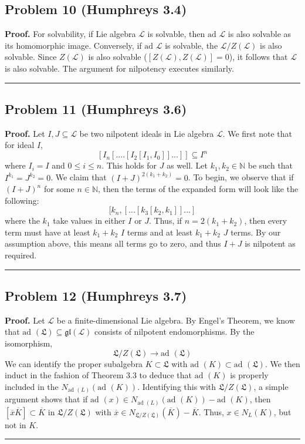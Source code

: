 \documentclass[12pt]{article}%
\newenvironment{proof}[1][Proof]{\textbf{#1.} }{\ \rule{0.5em}{0.5em}}
\begin{document}
  \subsection*{Problem 10 (Humphreys 3.4)}
    \begin{proof}
      For solvability, if Lie algebra $\mathcal{L}$ is solvable, then $\text{ad } \mathcal{L}$ is also solvable as its homomorphic image. Conversely, if  $\text{ad } \mathcal{L}$ is solvable, the $\mathcal{L}/Z(\mathcal{L})$ is also solvable. Since  $Z(\mathcal{L})$ is also solvable ($[Z(\mathcal{L}),Z(\mathcal{L})] = 0$), it follows that $\mathcal{L}$ is also solvable. The argument for nilpotency executes similarly.
    \end{proof}

  \subsection*{Problem 11 (Humphreys 3.6)}
    \begin{proof}
        Let $I,J \subseteq \mathcal{L}$ be two nilpotent ideals in Lie algebra $\mathcal{L}$. We first note that for ideal $I$,
        $$ [I_n[....[I_2[I_1,I_0]]...]] \subseteq I^n$$ where $I_i = I$ and $0 \leq i \leq n$. This holds for $J$ as well. Let $k_1,k_2 \in \mathbb{N}$ be such that $I^{k_1} = J^{k_2} = 0$. We claim that $(I+J)^{2(k_1 + k_2)} = 0$. To begin, we observe that if $(I + J)^n$ for some $n \in \mathbb{N}$, then the terms of the expanded form will look like the following:
        $$ [k_n,[...[k_3[k_2,k_1]]...]$$ where the $k_1$ take values in either $I$ or $J$. Thus, if $n = 2(k_1 + k_2)$, then every term must have at least $k_1 + k_2$ $I$ terms and at least $k_1 + k_2$ $J$ terms. By our assumption above, this means all terms go to zero, and thus $I+J$ is nilpotent as required.
    \end{proof}

  \subsection*{Problem 12 (Humphreys 3.7)}
      \begin{proof}
        Let $\mathcal{L}$ be a finite-dimensional Lie algebra. By Engel's Theorem, we know that $\text{ad }(\mathfrak{L}) \subseteq \mathfrak{gl}(\mathcal{L})$ consists of nilpotent endomorphisms. By the isomorphism,
        $$ \mathfrak{L} / Z(\mathfrak{L}) \rightarrow \text{ad }(\mathfrak{L})$$ We can identify the proper subalgebra $K \subset \mathfrak{L}$ with $\text{ad }(K) \subset \text{ad }(\mathfrak{L})$.
        We then induct in the fashion of Theorem 3.3 to deduce that $\text{ad }(K)$ is properly included in the $N_{\text{ad }(L)}(\text{ad }(K))$. Identifying this with $\mathfrak{L} / Z(\mathfrak{L})$, a simple argument shows that if $\text{ad }(x) \in N_{\text{ad }(L)}(\text{ad }(K)) - \text{ad }(K)$, then $[\overline{x}{\overline{K}}] \subset \overline{K}$ in  $ \mathfrak{L} / Z(\mathfrak{L})$ with $\overline{x} \in N_{\mathfrak{L} / Z(\mathfrak{L})}(\overline{K}) - \overline{K}
        $. Thus, $x \in N_L(K)$, but not in $K$.
      \end{proof}
\end{document}
